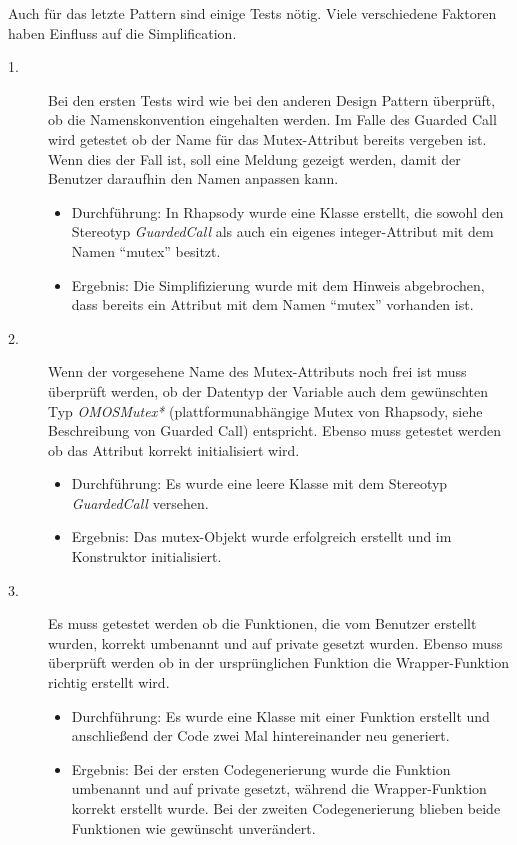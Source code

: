 Auch für das letzte Pattern sind einige Tests nötig. Viele verschiedene Faktoren
haben Einfluss auf die Simplification.
\begin{description}

	\item[1.]
	Bei den ersten Tests wird wie bei den anderen Design Pattern überprüft, ob die Namenskonvention eingehalten werden. Im Falle des Guarded Call wird getestet ob der Name für das Mutex-Attribut bereits vergeben ist. Wenn dies der Fall ist, soll eine Meldung gezeigt werden, damit der Benutzer daraufhin den Namen anpassen kann.
	\begin{itemize}
  		\item{Durchführung:}
			In Rhapsody wurde eine Klasse erstellt, die sowohl den Stereotyp \textit{GuardedCall} als auch ein eigenes integer-Attribut mit dem Namen \enquote{mutex} besitzt.
  		\item{Ergebnis:}
			Die Simplifizierung wurde mit dem Hinweis abgebrochen, dass bereits ein Attribut mit dem Namen \enquote{mutex} vorhanden ist.
  	\end{itemize}
	
	\item[2.]
	Wenn der vorgesehene Name des Mutex-Attributs noch frei ist muss überprüft werden, ob der Datentyp der Variable auch dem gewünschten Typ \textit{OMOSMutex*} (plattformunabhängige Mutex von Rhapsody, siehe Beschreibung von Guarded Call) entspricht. Ebenso muss getestet werden ob das Attribut korrekt initialisiert wird.
	\begin{itemize}
  		\item{Durchführung:}
			Es wurde eine leere Klasse mit dem Stereotyp \textit{GuardedCall} versehen.
  		\item{Ergebnis:}
			Das mutex-Objekt wurde erfolgreich erstellt und im Konstruktor initialisiert.
  	\end{itemize}
	
	\item[3.]
	Es muss getestet werden ob die Funktionen, die vom Benutzer erstellt wurden, korrekt umbenannt und auf private gesetzt wurden. Ebenso muss überprüft werden ob in der ursprünglichen Funktion die Wrapper-Funktion richtig erstellt wird.
	\begin{itemize}
  		\item{Durchführung:}
			Es wurde eine Klasse mit einer Funktion erstellt und anschließend der Code zwei Mal hintereinander neu generiert.
  		\item{Ergebnis:}
			Bei der ersten Codegenerierung wurde die Funktion umbenannt und auf private gesetzt, während die Wrapper-Funktion korrekt erstellt wurde. Bei der zweiten Codegenerierung blieben beide Funktionen wie gewünscht unverändert.
  	\end{itemize}
	

\end{description}
